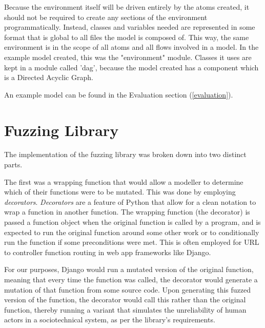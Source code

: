 Because the environment itself will be driven entirely by the atoms created, it should not be required to create any sections of the environment programmatically. Instead, classes and variables needed are represented in some format that is global to all files the model is composed of. This way, the same environment is in the scope of all atoms and all flows involved in a model. In the example model created, this was the "environment" module. Classes it uses are kept in a module called 'dag', because the model created has a component which is a Directed Acyclic Graph. \par

An example model can be found in the Evaluation section (\cref{evaluation}). \par

\section{Fuzzing Library}
\label{planning_fuzzing_implementation} %
The implementation of the fuzzing library was broken down into two distinct parts. \par

The first was a wrapping function that would allow a modeller to determine which of their functions were to be mutated. This was done by employing \emph{decorators}. \emph{Decorators} are a feature of Python that allow for a clean notation to wrap a function in another function. The wrapping function (the decorator) is passed a function object when the original function is called by a program, and is expected to run the original function around some other work or to conditionally run the function if some preconditions were met. This is often employed for URL to controller function routing in web app frameworks like Django\cite{Azzopardi2016a}. \par

For our purposes, Django would run a mutated version of the original function, meaning that every time the function was called, the decorator would generate a mutation of that function from some source code. Upon generating this fuzzed version of the function, the decorator would call this rather than the original function, thereby running a variant that simulates the unreliability of human actors in a sociotechnical system, as per the library's requirements. \par

